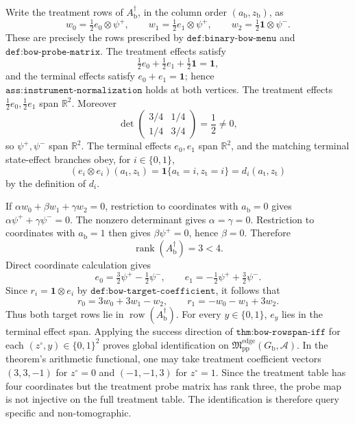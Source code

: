 Write the treatment rows of \(A_{\mathrm b}^{\dagger}\), in the column order \((a_{\mathrm b},z_{\mathrm b})\), as
\[
w_0=\tfrac12e_0\otimes\psi^+,
\qquad
w_1=\tfrac12e_1\otimes\psi^+,
\qquad
w_2=\tfrac12\mathbf 1\otimes\psi^-.
\]
These are precisely the rows prescribed by \(\texttt{def:binary-bow-menu}\) and \(\texttt{def:bow-probe-matrix}\).  The treatment effects satisfy
\[
\tfrac12e_0+\tfrac12e_1+\tfrac12\mathbf 1=\mathbf 1,
\]
and the terminal effects satisfy \(e_0+e_1=\mathbf 1\); hence \(\texttt{ass:instrument-normalization}\) holds at both vertices.  The treatment effects \(\tfrac12e_0,\tfrac12e_1\) span \(\mathbb R^2\).  Moreover
\[
\det\!\begin{pmatrix}3/4&1/4\\1/4&3/4\end{pmatrix}=\frac12\ne0,
\]
so \(\psi^+,\psi^-\) span \(\mathbb R^2\).  The terminal effects \(e_0,e_1\) span \(\mathbb R^2\), and the matching terminal state-effect branches obey, for \(i\in\{0,1\}\),
\[
(e_i\otimes e_i)(a_{\mathrm t},z_{\mathrm t})
=\mathbf 1\{a_{\mathrm t}=i,z_{\mathrm t}=i\}
=d_i(a_{\mathrm t},z_{\mathrm t})
\]
by the definition of \(d_i\).

If \(\alpha w_0+\beta w_1+\gamma w_2=0\), restriction to coordinates with \(a_{\mathrm b}=0\) gives \(\alpha\psi^++\gamma\psi^-=0\).  The nonzero determinant gives \(\alpha=\gamma=0\).  Restriction to coordinates with \(a_{\mathrm b}=1\) then gives \(\beta\psi^+=0\), hence \(\beta=0\).  Therefore
\[
\operatorname{rank}(A_{\mathrm b}^{\dagger})=3<4.
\]
Direct coordinate calculation gives
\[
e_0=\tfrac32\psi^+-\tfrac12\psi^- ,
\qquad
e_1=-\tfrac12\psi^++\tfrac32\psi^-.
\]
Since \(r_i=\mathbf 1\otimes e_i\) by \(\texttt{def:bow-target-coefficient}\), it follows that
\[
r_0=3w_0+3w_1-w_2,
\qquad
r_1=-w_0-w_1+3w_2.
\]
Thus both target rows lie in \(\operatorname{row}(A_{\mathrm b}^{\dagger})\).  For every \(y\in\{0,1\}\), \(e_y\) lies in the terminal effect span.  Applying the success direction of \(\texttt{thm:bow-rowspan-iff}\) for each \((z^{\circ},y)\in\{0,1\}^2\) proves global identification on \(\mathfrak M_{\mathrm{pp}}^{\mathrm{edge}}(G_{\mathrm b},\mathcal A)\).  In the theorem's arithmetic functional, one may take treatment coefficient vectors \((3,3,-1)\) for \(z^{\circ}=0\) and \((-1,-1,3)\) for \(z^{\circ}=1\).  Since the treatment table has four coordinates but the treatment probe matrix has rank three, the probe map is not injective on the full treatment table.  The identification is therefore query specific and non-tomographic.